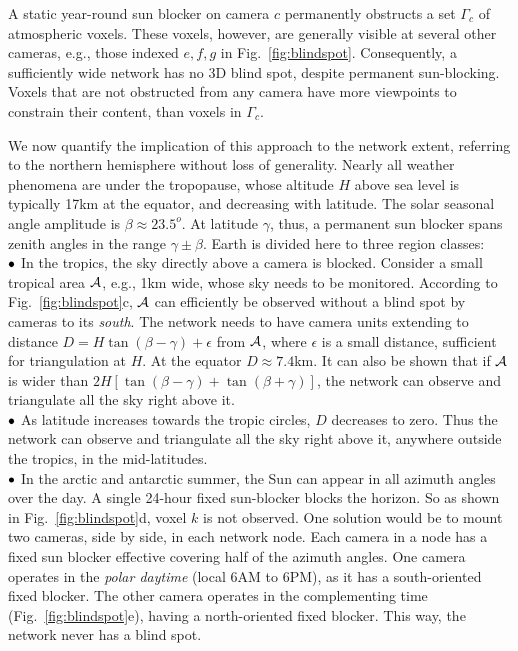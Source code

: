 \documentclass[runningheads]{llncs}
\begin{document}
A static year-round sun blocker on camera $c$ permanently obstructs a set $\Gamma_c$ of atmospheric voxels. These voxels, however, are generally visible at several other cameras, e.g., those indexed $e,f,g$ in Fig.~\ref{fig:blindspot}. Consequently, a sufficiently wide network has no 3D blind spot, despite permanent sun-blocking. Voxels that are not obstructed from any camera have more viewpoints to constrain their content, than voxels in $\Gamma_c$.

We now quantify the implication of this approach to the network extent, referring to the northern hemisphere without loss of generality.
Nearly all weather phenomena are under the tropopause, whose altitude $H$ above sea level is typically 17km at the equator, and decreasing with latitude. The solar seasonal angle amplitude is $\beta\approx23.5^o$. At latitude $\gamma$, thus, a permanent sun blocker spans zenith angles in the range $\gamma\pm\beta$. Earth is divided here to three region classes:\\
  ${\bf \bullet}$ In the tropics, the sky directly above a camera is blocked. Consider
  a small tropical area ${\cal A}$, e.g., 1km wide, whose sky needs to be monitored. According to Fig.~\ref{fig:blindspot}c, ${\cal A}$ can efficiently be observed without
  a blind spot by cameras to its {\em south}. The network needs to have camera units extending to distance  $D=H\tan(\beta-\gamma)+\epsilon$ from ${\cal A}$, where $\epsilon$ is a small distance, sufficient for triangulation at $H$. At the equator $D\approx7.4$km.
  It can also be shown that if ${\cal A}$ is wider than $2H[\tan(\beta-\gamma)+\tan(\beta+\gamma)]$, the network can observe and triangulate all the sky right above it.\\
${\bf \bullet}$  As latitude increases towards the tropic circles, $D$ decreases to zero. Thus the network can observe and triangulate all the sky right above it, anywhere outside the tropics, in the mid-latitudes.\\
  ${\bf \bullet}$ In the arctic and antarctic summer, the Sun can appear in all azimuth angles over the day. A single 24-hour fixed sun-blocker blocks the horizon. So as shown in Fig.~\ref{fig:blindspot}d, voxel $k$ is not observed. One solution would be to mount two cameras, side by side, in each network node. Each camera in a node has a fixed sun blocker effective covering half of the azimuth angles. One camera operates in the {\em polar daytime} (local 6AM to 6PM), as it has a south-oriented fixed blocker. The other camera operates in the complementing time (Fig.~\ref{fig:blindspot}e), having a north-oriented fixed blocker. This way, the network never has a blind spot.
\end{document}
